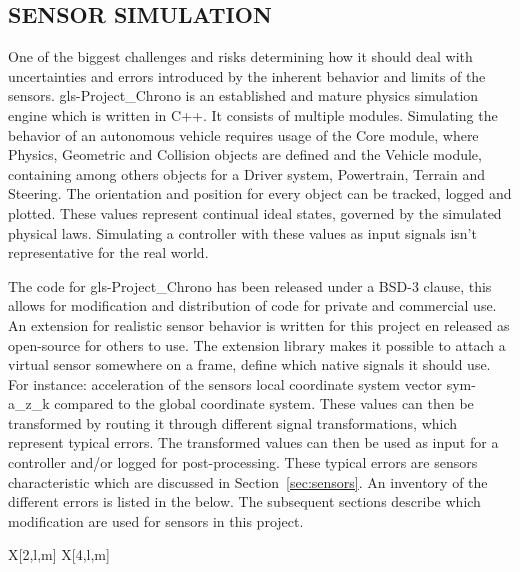 \subsection{SENSOR SIMULATION}\label{sec:sensor simulation}

One of the biggest challenges and risks determining how it should deal with uncertainties and errors introduced by 
the inherent behavior and limits of the sensors. \gls{gls-Project_Chrono} is an established and mature physics 
simulation engine which is written in C++. It consists of multiple modules. Simulating the behavior of an autonomous 
vehicle requires usage of the Core module, where Physics, Geometric and Collision objects are defined and the Vehicle
module, containing among others objects for a Driver system, Powertrain, Terrain and Steering. The orientation and 
position for every object can be tracked, logged and plotted. These values represent continual ideal states, governed
by the simulated physical laws. Simulating a controller with these values as input signals isn't representative for 
the real world.

The code for \gls{gls-Project_Chrono} has been released under a BSD-3 clause, this allows for modification and
distribution of
code for private and commercial use. An extension for realistic sensor behavior is written for this project en released
as open-source for others to use. The extension library makes it possible to attach a virtual sensor somewhere on a
frame, define which native signals it should use. For instance: acceleration of the sensors local coordinate system
vector \gls{sym-a_z_k} compared to the global coordinate system. These values can then be transformed by routing it
through different signal transformations, which represent typical errors. The transformed values can then be used as
input for a controller and/or logged for post-processing. These typical errors are sensors characteristic which are
discussed in Section~\ref{sec:sensors}. An inventory of the different errors is listed in the below. The subsequent
sections describe which modification are used for sensors in this project.

\begin{RoyalTable}{X[2,l,m] X[4,l,m]}
\end{RoyalTable}

